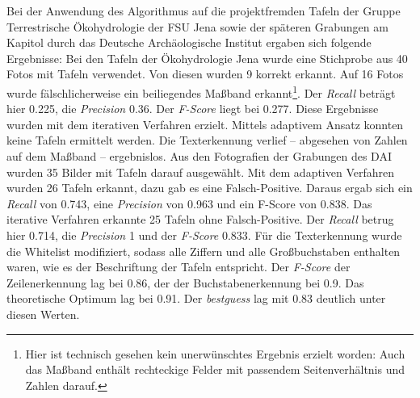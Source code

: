 Bei der Anwendung des Algorithmus auf die projektfremden Tafeln der Gruppe Terrestrische Ökohydrologie der FSU Jena sowie der späteren Grabungen am Kapitol durch das Deutsche Archäologische Institut ergaben sich folgende Ergebnisse:
Bei den Tafeln der Ökohydrologie Jena wurde eine Stichprobe aus 40 Fotos mit Tafeln verwendet. Von diesen wurden 9 korrekt erkannt. Auf 16 Fotos wurde fälschlicherweise ein beiliegendes Maßband erkannt\footnote{Hier ist technisch gesehen kein unerwünschtes Ergebnis erzielt worden: Auch das Maßband enthält rechteckige Felder mit passendem Seitenverhältnis und Zahlen darauf.}. Der \textit{Recall} beträgt hier 0.225, die \textit{Precision} 0.36. Der \textit{F-Score} liegt bei 0.277. Diese Ergebnisse wurden mit dem iterativen Verfahren erzielt. Mittels adaptivem Ansatz konnten keine Tafeln ermittelt werden. Die Texterkennung verlief -- abgesehen von Zahlen auf dem Maßband -- ergebnislos.
Aus den Fotografien der Grabungen des DAI wurden 35 Bilder mit Tafeln darauf ausgewählt. Mit dem adaptiven Verfahren wurden 26 Tafeln erkannt, dazu gab es eine Falsch-Positive. Daraus ergab sich ein \textit{Recall} von 0.743, eine \textit{Precision} von 0.963 und ein {F-Score} von 0.838. Das iterative Verfahren erkannte 25 Tafeln ohne Falsch-Positive. Der \textit{Recall} betrug hier 0.714, die \textit{Precision} 1 und der \textit{F-Score} 0.833.
Für die Texterkennung wurde die Whitelist modifiziert, sodass alle Ziffern und alle Großbuchstaben enthalten waren, wie es der Beschriftung der Tafeln entspricht. Der \textit{F-Score} der Zeilenerkennung lag bei 0.86, der der Buchstabenerkennung bei 0.9. Das theoretische Optimum lag bei 0.91. Der \textit{bestguess} lag mit 0.83 deutlich unter diesen Werten.
